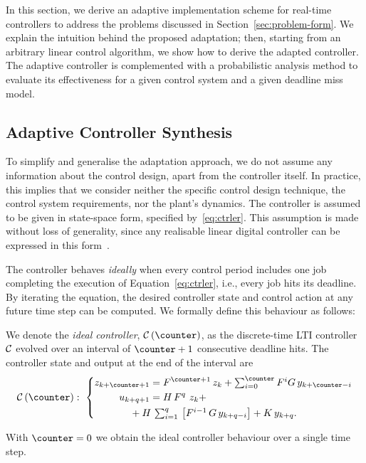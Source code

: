 In this section, we derive an adaptive implementation scheme for real-time controllers to address the problems discussed in Section~\ref{sec:problem-form}.
We explain the intuition behind the proposed adaptation; then, starting from an arbitrary linear control algorithm, we show how to derive the adapted controller.
The adaptive controller is complemented with a probabilistic analysis method to evaluate its effectiveness for a given control system and a given deadline miss model.

\subsection{Adaptive Controller Synthesis}%
\label{sec:adaptation}%
%
To simplify and generalise the adaptation approach, we do not assume any information about the control design, apart from the controller itself. 
In practice, this implies that we consider neither the specific control design technique, the control system requirements, nor the plant's dynamics.
The controller is assumed to be given in state-space form, specified by~\eqref{eq:ctrler}.
This assumption is made without loss of generality, since any realisable linear digital controller can be expressed in this form~\cite{Astrom:2008}.

The controller behaves \emph{ideally} when every control period includes one job completing the execution of Equation~\eqref{eq:ctrler}, i.e., every job hits its deadline.
By iterating the equation, the desired controller state and control action at any future time step can be computed. 
We formally define this behaviour as follows:

\begin{definition}%
    We denote the \emph{ideal controller}, $\ctrler\funof{\counter}$, as the discrete-time LTI controller $\mathcal{C}$ evolved over an interval of $\counter+1$ consecutive deadline hits.
    The controller state and output at the end of the interval are
    \begin{equation}
        \label{eq:ctrler-ideal}
        \ctrler\funof{\counter}:\,\, 
        \left\{\begin{aligned}
            z_{k+\counter+1} &= \Ac^{\counter+1}\,z_{k} + \textstyle\sum_{i=0}^{\counter} \Ac^i \Bc \,y_{k+\counter-i}\\
            u_{k+q+1} &= \Cc\, \Ac^{q}\,\,z_k + \\
            &\hspace{-2em}+ \Cc\, \textstyle\sum\nolimits_{i=1}^{q}\, \left[ \Ac^{i-1}\, \Bc\, y_{k+q-i}\right] 
            + \Dc\, y_{k+q}.
        \end{aligned}\right.
    \end{equation}
\end{definition}
With $\counter=0$ we obtain the ideal controller behaviour over a single time step.

